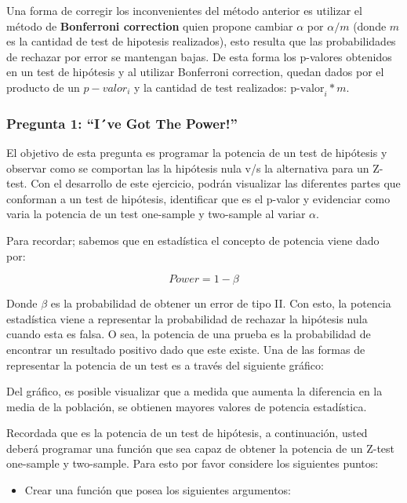 \documentclass[]{article}
\providecommand{\tightlist}{%
  \setlength{\itemsep}{0pt}\setlength{\parskip}{0pt}}
\begin{document}
Una forma de corregir los inconvenientes del método anterior es utilizar
el método de \textbf{Bonferroni correction} quien propone cambiar
\(\alpha\) por \(\alpha/m\) (donde \(m\) es la cantidad de test de
hipotesis realizados), esto resulta que las probabilidades de rechazar
por error se mantengan bajas. De esta forma los p-valores obtenidos en
un test de hipótesis y al utilizar Bonferroni correction, quedan dados
por el producto de un \(p-valor_{i}\) y la cantidad de test realizados:
\(\text{p-valor}_{i}*m\).

\hypertarget{pregunta-1-ive-got-the-power}{%
\subsubsection{Pregunta 1: ``I´ve Got The
Power!''}\label{pregunta-1-ive-got-the-power}}

El objetivo de esta pregunta es programar la potencia de un test de
hipótesis y observar como se comportan las la hipótesis nula v/s la
alternativa para un Z-test. Con el desarrollo de este ejercicio, podrán
visualizar las diferentes partes que conforman a un test de hipótesis,
identificar que es el p-valor y evidenciar como varia la potencia de un
test one-sample y two-sample al variar \(\alpha\).

Para recordar; sabemos que en estadística el concepto de potencia viene
dado por:

\[Power = 1 - \beta\]

Donde \(\beta\) es la probabilidad de obtener un error de tipo II. Con
esto, la potencia estadística viene a representar la probabilidad de
rechazar la hipótesis nula cuando esta es falsa. O sea, la potencia de
una prueba es la probabilidad de encontrar un resultado positivo dado
que este existe. Una de las formas de representar la potencia de un test
es a través del siguiente gráfico:

Del gráfico, es posible visualizar que a medida que aumenta la
diferencia en la media de la población, se obtienen mayores valores de
potencia estadística.

Recordada que es la potencia de un test de hipótesis, a continuación,
usted deberá programar una función que sea capaz de obtener la potencia
de un Z-test one-sample y two-sample. Para esto por favor considere los
siguientes puntos:

\begin{itemize}
\tightlist
\item
  Crear una función que posea los siguientes argumentos:
\end{itemize}
\end{document}
